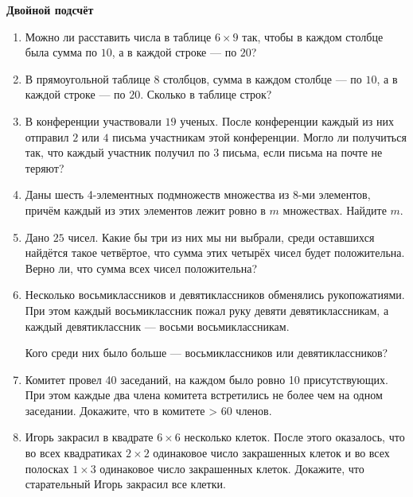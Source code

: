 \documentclass{article}
\begin{document}
\large
	
	
\begin{center}
	\textbf{Двойной подсчёт}
\end{center}



\begin{enumerate}[label*=\protect\fbox{\arabic{enumi}}]

\item Можно ли расставить числа в таблице $6 \times 9$ так, чтобы в каждом столбце была сумма по $10$, а в каждой строке — по $20$?

\item В прямоугольной таблице $8$ столбцов, сумма в каждом столбце — по $10$, а в каждой строке — по $20$. Сколько в таблице строк?

\item В конференции участвовали $19$ ученых. После конференции каждый из них отправил $2$ или $4$ письма участникам этой конференции. Могло ли получиться так, что каждый участник получил по $3$ письма, если письма на почте не теряют?

\item Даны шесть 4-элементных подмножеств множества из 8-ми элементов, причём каждый из этих элементов лежит ровно в $m$ множествах. Найдите $m$.

\item Дано $25$ чисел. Какие бы три из них мы ни выбрали, среди оставшихся найдётся такое четвёртое, что сумма этих четырёх чисел будет положительна. Верно ли, что сумма всех чисел положительна?

\item Несколько восьмиклассников и девятиклассников обменялись рукопожатиями. При этом каждый восьмиклассник пожал руку девяти девятиклассникам, а каждый девятиклассник — восьми восьмиклассникам.

Кого среди них было больше — восьмиклассников или девятиклассников?

\item Комитет провел 40 заседаний, на каждом было ровно 10 присутствующих. При этом каждые два члена комитета встретились не более чем на одном заседании. Докажите, что в комитете > 60 членов.

\item Игорь закрасил в квадрате $6\times6$ несколько клеток. После этого оказалось, что во всех квадратиках $2\times2$ одинаковое число закрашенных клеток и во всех полосках $1\times3$ одинаковое число закрашенных клеток. Докажите, что старательный Игорь закрасил все клетки.


\end{enumerate}
\end{document}
